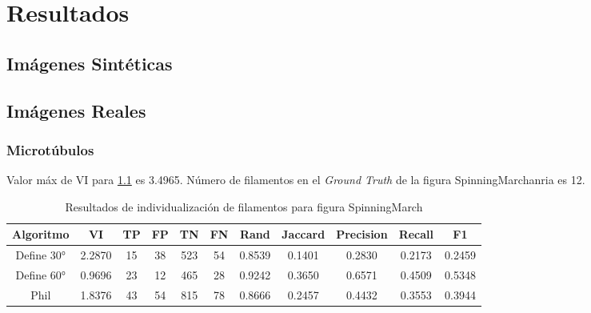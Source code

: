 \chapter{Resultados}
\label{chap:res}

\section{Im\'agenes Sint\'eticas}

\section{Im\'agenes Reales}

\subsection{Microt\'ubulos}


Valor m\'ax de VI para \ref{tab:SpinningMarchantiaResults1} es 3.4965.
N\'umero de filamentos en el {\it Ground Truth} de la figura SpinningMarchanria es 12.
\begin{table}[h]
    \centering
    \begin{tabular}{|c|c|c|c|c|c|c|c|c|c|c|}
    \hline
        Algoritmo & VI & TP & FP &TN &FN & Rand	& Jaccard &	Precision &	Recall &	F1 \\ \hline
        Define 30° & 2.2870  & 15 & 38 & 523 & 54 & 0.8539 & 0.1401 & 0.2830 & 0.2173 & 0.2459\\
        Define 60° & 0.9696 & 23 & 12 & 465 & 28 & 0.9242 & 0.3650 & 0.6571 & 0.4509  & 0.5348 \\ 
        Phil & 1.8376 & 43 & 54 & 815 & 78 & 0.8666 & 0.2457 & 0.4432 & 0.3553 & 0.3944 \\
        \hline
    \end{tabular}
    \caption{Resultados de individualizaci\'on de filamentos para figura SpinningMarch}
    \label{tab:SpinningMarchantiaResults1}
\end{table}

